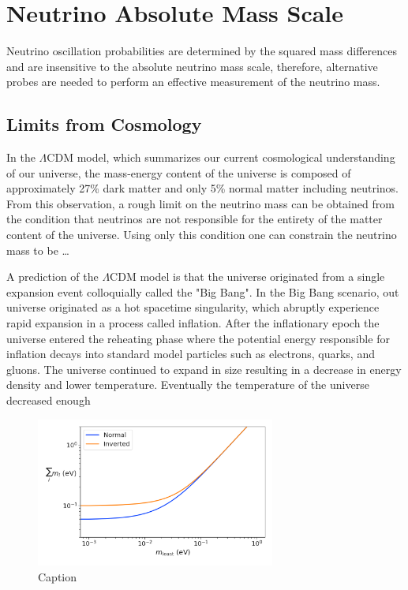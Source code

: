\section{Neutrino Absolute Mass Scale}

Neutrino oscillation probabilities are determined by the squared mass differences and are insensitive to the absolute neutrino mass scale, therefore, alternative probes are needed to perform an effective measurement of the neutrino mass.

\subsection{Limits from Cosmology}

In the $\Lambda$CDM model, which summarizes our current cosmological understanding of our universe, the mass-energy content of the universe is composed of approximately 27\% dark matter and only 5\% normal matter including neutrinos. From this observation, a rough limit on the neutrino mass can be obtained from the condition that neutrinos are not responsible for the entirety of the matter content of the universe. Using only this condition one can constrain the neutrino mass to be \ldots

A prediction of the $\Lambda$CDM model is that the universe originated from a single expansion event colloquially called the "Big Bang". In the Big Bang scenario, out universe originated as a hot spacetime singularity, which abruptly experience rapid expansion in a process called inflation. After the inflationary epoch the universe entered the reheating phase where the potential energy responsible for inflation decays into standard model particles such as electrons, quarks, and gluons. The universe continued to expand in size resulting in a decrease in energy density and lower temperature. Eventually the temperature of the universe decreased enough 

\begin{figure}[htbp]
    \centering
    \includegraphics[width=0.7\textwidth]{figs/Chapter-2/230301_cosmology_nu_mass_observable.png}
    \caption{Caption}
    \label{fig:nu_mass_cosmo}
\end{figure}


